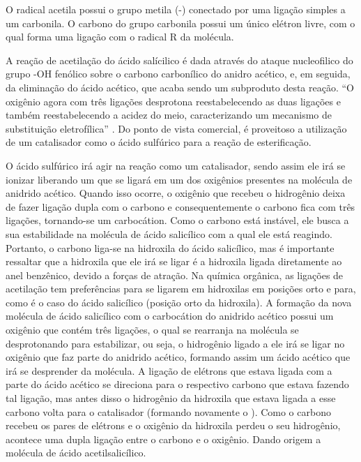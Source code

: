 O radical acetila possui o grupo metila (-) conectado por uma ligação simples a um carbonila. O
carbono do grupo carbonila possui um único elétron livre, com o qual forma uma ligação com o radical R da
molécula.

A reação de acetilação do ácido salícilico é dada através do ataque nucleofilico do grupo -OH fenólico
sobre o carbono carbonílico do anidro acético, e, em seguida, da eliminação do ácido acético, que acaba
sendo um subproduto desta reação. “O oxigênio agora com três ligações desprotona reestabelecendo as duas
ligações e também reestabelecendo a acidez do meio, caracterizando um mecanismo de substituição
eletrofílica” \cite{lopes2011}. Do ponto de vista comercial, é proveitoso a utilização de um catalisador
como o ácido sulfúrico para a reação de esterificação. \cite{PERUCH2013}

O ácido sulfúrico irá agir na reação como um catalisador, sendo assim ele irá se ionizar liberando
um  que se ligará em um dos oxigênios presentes na molécula de anidrido acético. Quando isso
ocorre, o oxigênio que recebeu o hidrogênio deixa de fazer ligação dupla com o carbono e
consequentemente o carbono fica com três ligações, tornando-se um carbocátion. Como o carbono está
instável, ele busca a sua estabilidade na molécula de ácido salicílico com a qual ele está reagindo.
Portanto, o carbono liga-se na hidroxila do ácido salicílico, mas é importante ressaltar que a
hidroxila que ele irá se ligar é a hidroxila ligada diretamente ao anel benzênico, devido a forças
de atração. Na química orgânica, as ligações de acetilação tem preferências para se ligarem em
hidroxilas em posições orto e para, como é o caso do ácido salicílico (posição orto da hidroxila). A
formação da nova molécula de ácido salicílico com o carbocátion do anidrido acético possui um
oxigênio que contém três ligações, o qual se rearranja na molécula se desprotonando para
estabilizar, ou seja, o hidrogênio ligado a ele irá se ligar no oxigênio que faz parte do anidrido
acético, formando assim um ácido acético que irá se desprender da molécula. A ligação de elétrons
que estava ligada com a parte do ácido acético se direciona para o respectivo carbono que estava
fazendo tal ligação, mas antes disso o hidrogênio da hidroxila que estava ligada a esse carbono
volta para o catalisador (formando novamente o ). Como o carbono recebeu os pares de elétrons e
o oxigênio da hidroxila perdeu o seu hidrogênio, acontece uma dupla ligação entre o carbono e o
oxigênio. Dando origem a molécula de ácido acetilsalicílico.


